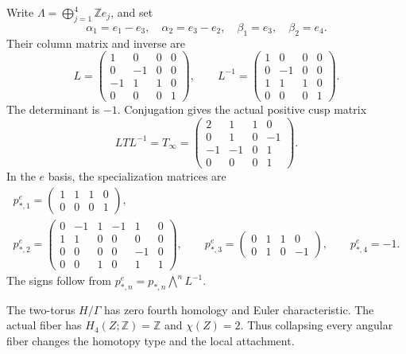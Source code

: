 Write $\Lambda=\bigoplus_{j=1}^4\mathbb Ze_j$, and set
\begin{equation}\label{c26:eq:commonbasis}
\alpha_1=e_1-e_3,\quad \alpha_2=e_3-e_2,\quad
\beta_1=e_3,\quad\beta_2=e_4.
\end{equation}
Their column matrix and inverse are
\[
L=\begin{pmatrix}1&0&0&0\\0&-1&0&0\\-1&1&1&0\\0&0&0&1\end{pmatrix},
\qquad L^{-1}=\begin{pmatrix}1&0&0&0\\0&-1&0&0\\1&1&1&0\\0&0&0&1\end{pmatrix}.
\]
The determinant is $-1$. Conjugation gives the actual positive cusp matrix
\begin{equation}\label{c26:eq:nativemonodromy}
LTL^{-1}=T_\infty=
\begin{pmatrix}2&1&1&0\\0&1&0&-1\\-1&-1&0&1\\0&0&0&1\end{pmatrix}.
\end{equation}
In the $e$ basis, the specialization matrices are
\begin{equation}\label{c26:eq:nativemaps}
\begin{gathered}
p_{*,1}^{e}=\begin{pmatrix}1&1&1&0\\0&0&0&1\end{pmatrix},\\
p_{*,2}^{e}=\begin{pmatrix}
0&-1&1&-1&1&0\\1&1&0&0&0&0\\0&0&0&0&-1&0\\0&0&1&0&1&1
\end{pmatrix},\qquad
p_{*,3}^{e}=\begin{pmatrix}0&1&1&0\\0&1&0&-1\end{pmatrix},\qquad
p_{*,4}^{e}=-1.
\end{gathered}
\end{equation}
The signs follow from $p_{*,n}^{e}=p_{*,n}\bigwedge^nL^{-1}$.

\begin{remark}
The two-torus $H/\Gamma$ has zero fourth homology and Euler characteristic.
The actual fiber has $H_4(Z;\mathbb Z)=\mathbb Z$ and $\chi(Z)=2$.
Thus collapsing every angular fiber changes the homotopy type
and the local attachment.
\end{remark}

